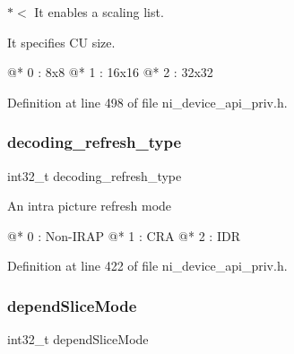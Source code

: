 $\ast$$<$ It enables a scaling list.


\begin{DoxyItemize}
\item \begin{DoxyVerb}It specifies CU size.

@* 0 : 8x8
@* 1 : 16x16
@* 2 : 32x32
\end{DoxyVerb}
 
\end{DoxyItemize}

Definition at line 498 of file ni\+\_\+device\+\_\+api\+\_\+priv.\+h.

\mbox{\label{struct__ni__encoder__change__params__t_a536cda1521aab86fe11a8af60dfba81b}} 
\subsubsection{\texorpdfstring{decoding\_refresh\_type}{decoding\_refresh\_type}}
{\footnotesize\ttfamily int32\+\_\+t decoding\+\_\+refresh\+\_\+type}


\begin{DoxyItemize}
\item \begin{DoxyVerb}An intra picture refresh mode

@* 0 : Non-IRAP
@* 1 : CRA
@* 2 : IDR
\end{DoxyVerb}
 
\end{DoxyItemize}

Definition at line 422 of file ni\+\_\+device\+\_\+api\+\_\+priv.\+h.

\mbox{\label{struct__ni__encoder__change__params__t_ab8e0ef7bdea29cbeb8cafb61dab9c65a}} 
\subsubsection{\texorpdfstring{dependSliceMode}{dependSliceMode}}
{\footnotesize\ttfamily int32\+\_\+t depend\+Slice\+Mode}

